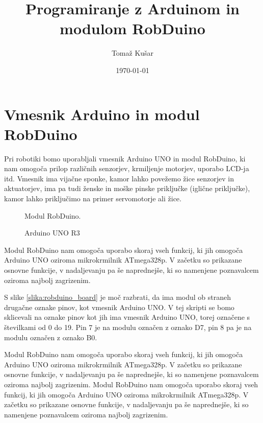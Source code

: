 \documentclass[11pt,a4paper]{article}
\title{Programiranje z Arduinom in modulom RobDuino}
\author{Tomaž Kušar}
\date\today
\begin{document}
\maketitle
\thispagestyle{empty}
\newpage
\setcounter{page}{1}
\tableofcontents
\newpage

\section{Vmesnik Arduino in modul RobDuino}
Pri robotiki bomo uporabljali vmesnik Arduino UNO in modul RobDuino, ki nam omogoča prilop različnih senzorjev, krmiljenje motorjev, uporabo LCD-ja itd. Vmesnik ima vijačne sponke, kamor lahko povežemo žice senzorjev in aktuatorjev, ima pa tudi ženske in moške pinske priključke (iglične priključke), kamor lahko priključimo na primer servomotorje ali žice.


\begin{figure}[h] %
\centering
\parbox{5cm}{
\caption{Modul RobDuino.}\label{slika:robduino_board}
\label{slika:robduino_board}}%
\qquad
\begin{minipage}{5cm}
\caption{Arduino UNO R3}\label{slika:arduinouno}
\label{slika:arduinoUNO}%
\end{minipage}%
\end{figure}


Modul RobDuino nam omogoča uporabo skoraj vseh funkcij, ki jih omogoča Arduino UNO oziroma mikrokrmilnik ATmega328p. V začetku so prikazane osnovne funkcije, v nadaljevanju pa še naprednejše, ki so namenjene poznavalcem oziroma najbolj zagrizenim.  

S slike \ref{slika:robduino_board} je moč razbrati, da ima modul ob straneh drugačne oznake pinov, kot vmesnik Arduino UNO. V tej skripti se bomo sklicevali na oznake pinov kot jih ima vmesnik Arduino UNO, torej označene s številkami od 0 do 19. Pin 7 je na modulu označen z oznako D7, pin 8 pa je na modulu označen z oznako B0.   

Modul RobDuino nam omogoča uporabo skoraj vseh funkcij, ki jih omogoča Arduino UNO oziroma mikrokrmilnik ATmega328p. V začetku so prikazane osnovne funkcije, v nadaljevanju pa še naprednejše, ki so namenjene poznavalcem oziroma najbolj zagrizenim.  
Modul RobDuino nam omogoča uporabo skoraj vseh funkcij, ki jih omogoča Arduino UNO oziroma mikrokrmilnik ATmega328p. V začetku so prikazane osnovne funkcije, v nadaljevanju pa še naprednejše, ki so namenjene poznavalcem oziroma najbolj zagrizenim.  
\end{document}
